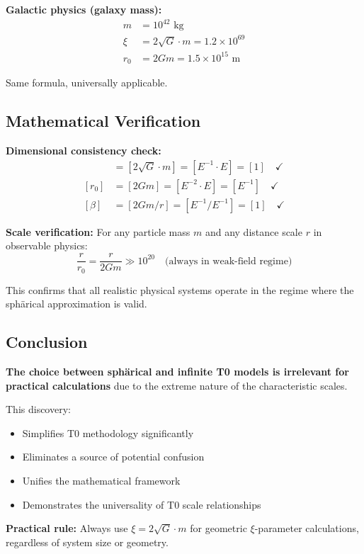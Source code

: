 \documentclass[12pt,a4paper]{article}
\begin{document}
\textbf{Galactic physics (galaxy mass):}
\begin{align}
	m &= 10^{42} \text{ kg} \\
	\xi &= 2\sqrt{G} \cdot m = 1.2 \times 10^{69} \\
	r_0 &= 2Gm = 1.5 \times 10^{15} \text{ m}
\end{align}

Same formula, universally applicable.

\subsection{Mathematical Verification}
\label{subsec:mathematical_verification}

\textbf{Dimensional consistency check:}
\begin{align}
	[\xi] &= [2\sqrt{G} \cdot m] = [E^{-1} \cdot E] = [1] \quad \checkmark \\
	[r_0] &= [2Gm] = [E^{-2} \cdot E] = [E^{-1}] \quad \checkmark \\
	[\beta] &= [2Gm/r] = [E^{-1}/E^{-1}] = [1] \quad \checkmark
\end{align}

\textbf{Scale verification:}
For any particle mass $m$ and any distance scale $r$ in observable physics:
\begin{equation}
	\frac{r}{r_0} = \frac{r}{2Gm} \gg 10^{20} \quad \text{(always in weak-field regime)}
\end{equation}

This confirms that all realistic physical systems operate in the regime where the sphärical approximation is valid.

\subsection{Conclusion}
\label{subsec:model_choice_conclusion}

\begin{tcolorbox}[colback=green!5!white,colframe=green!75!black,title=Key Result]
	\textbf{The choice between sphärical and infinite T0 models is irrelevant for practical calculations} due to the extreme nature of the characteristic scales.
	
	This discovery:
	\begin{itemize}
		\item Simplifies T0 methodology significantly
		\item Eliminates a source of potential confusion
		\item Unifies the mathematical framework
		\item Demonstrates the universality of T0 scale relationships
	\end{itemize}
	
	\textbf{Practical rule:} Always use $\xi = 2\sqrt{G} \cdot m$ for geometric $\xi$-parameter calculations, regardless of system size or geometry.
\end{tcolorbox}
\end{document}
